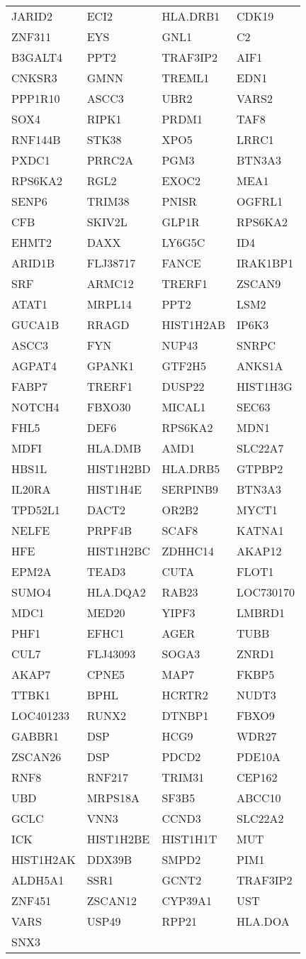 {\begin{longtable}{llll}
JARID2&ECI2&HLA.DRB1&CDK19\tabularnewline
\newpage
ZNF311&EYS&GNL1&C2\tabularnewline
B3GALT4&PPT2&TRAF3IP2&AIF1\tabularnewline
CNKSR3&GMNN&TREML1&EDN1\tabularnewline
PPP1R10&ASCC3&UBR2&VARS2\tabularnewline
SOX4&RIPK1&PRDM1&TAF8\tabularnewline
RNF144B&STK38&XPO5&LRRC1\tabularnewline
PXDC1&PRRC2A&PGM3&BTN3A3\tabularnewline
RPS6KA2&RGL2&EXOC2&MEA1\tabularnewline
SENP6&TRIM38&PNISR&OGFRL1\tabularnewline
CFB&SKIV2L&GLP1R&RPS6KA2\tabularnewline
EHMT2&DAXX&LY6G5C&ID4\tabularnewline
ARID1B&FLJ38717&FANCE&IRAK1BP1\tabularnewline
SRF&ARMC12&TRERF1&ZSCAN9\tabularnewline
ATAT1&MRPL14&PPT2&LSM2\tabularnewline
GUCA1B&RRAGD&HIST1H2AB&IP6K3\tabularnewline
ASCC3&FYN&NUP43&SNRPC\tabularnewline
AGPAT4&GPANK1&GTF2H5&ANKS1A\tabularnewline
FABP7&TRERF1&DUSP22&HIST1H3G\tabularnewline
NOTCH4&FBXO30&MICAL1&SEC63\tabularnewline
FHL5&DEF6&RPS6KA2&MDN1\tabularnewline
MDFI&HLA.DMB&AMD1&SLC22A7\tabularnewline
HBS1L&HIST1H2BD&HLA.DRB5&GTPBP2\tabularnewline
IL20RA&HIST1H4E&SERPINB9&BTN3A3\tabularnewline
TPD52L1&DACT2&OR2B2&MYCT1\tabularnewline
NELFE&PRPF4B&SCAF8&KATNA1\tabularnewline
HFE&HIST1H2BC&ZDHHC14&AKAP12\tabularnewline
EPM2A&TEAD3&CUTA&FLOT1\tabularnewline
SUMO4&HLA.DQA2&RAB23&LOC730170\tabularnewline
MDC1&MED20&YIPF3&LMBRD1\tabularnewline
PHF1&EFHC1&AGER&TUBB\tabularnewline
CUL7&FLJ43093&SOGA3&ZNRD1\tabularnewline
AKAP7&CPNE5&MAP7&FKBP5\tabularnewline
TTBK1&BPHL&HCRTR2&NUDT3\tabularnewline
LOC401233&RUNX2&DTNBP1&FBXO9\tabularnewline
GABBR1&DSP&HCG9&WDR27\tabularnewline
ZSCAN26&DSP&PDCD2&PDE10A\tabularnewline
RNF8&RNF217&TRIM31&CEP162\tabularnewline
UBD&MRPS18A&SF3B5&ABCC10\tabularnewline
GCLC&VNN3&CCND3&SLC22A2\tabularnewline
ICK&HIST1H2BE&HIST1H1T&MUT\tabularnewline
\newpage
HIST1H2AK&DDX39B&SMPD2&PIM1\tabularnewline
ALDH5A1&SSR1&GCNT2&TRAF3IP2\tabularnewline
ZNF451&ZSCAN12&CYP39A1&UST\tabularnewline
VARS&USP49&RPP21&HLA.DOA\tabularnewline
SNX3&&&\tabularnewline
\bottomrule
\end{longtable}}
\addtocounter{table}{-1}
